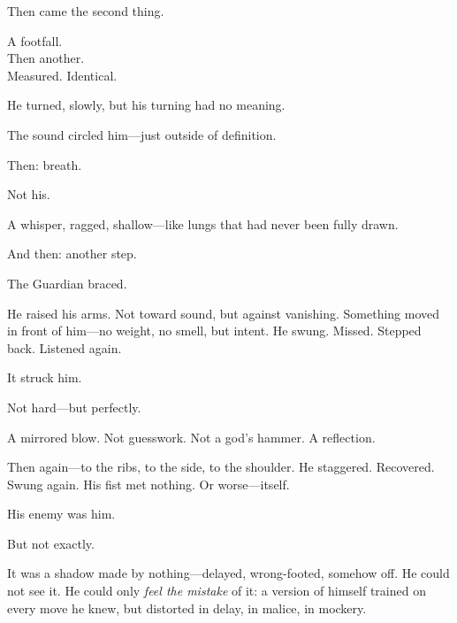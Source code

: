 \documentclass[12pt]{article}
\begin{document}
\vspace{0.5em}
Then came the second thing.

\vspace{0.5em}
A footfall.\\
Then another.\\
Measured. Identical.

\vspace{0.5em}
He turned, slowly, but his turning had no meaning.

\vspace{0.5em}
The sound circled him---just outside of definition.

\vspace{0.5em}
Then: breath.

\vspace{0.5em}
Not his.

\vspace{0.5em}
A whisper, ragged, shallow---like lungs that had never been fully drawn.

\vspace{0.5em}
And then: another step.

\vspace{0.5em}
The Guardian braced.

\vspace{0.5em}
He raised his arms. Not toward sound, but against vanishing. Something moved in front of him---no weight, no smell, but intent. He swung. Missed. Stepped back. Listened again.

\vspace{0.5em}
It struck him.

\vspace{0.5em}
Not hard---but perfectly.

\vspace{0.5em}
A mirrored blow. Not guesswork. Not a god’s hammer. A reflection.

\vspace{0.5em}
Then again---to the ribs, to the side, to the shoulder. He staggered. Recovered. Swung again. His fist met nothing. Or worse---itself.

\vspace{0.5em}
His enemy was him.

\vspace{0.5em}
But not exactly.

\vspace{0.5em}
It was a shadow made by nothing---delayed, wrong-footed, somehow off. He could not see it. He could only \textit{feel the mistake} of it: a version of himself trained on every move he knew, but distorted in delay, in malice, in mockery.
\end{document}

